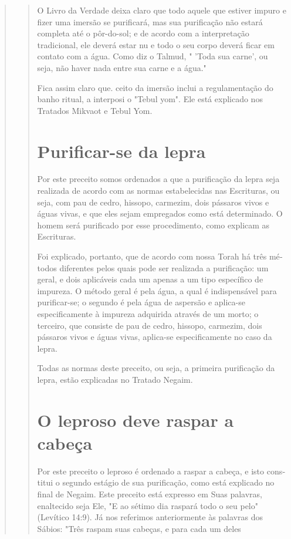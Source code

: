 \begin{quote}
\begin{quote}
O Livro da Verdade deixa claro que todo aquele que estiver impuro e
fizer uma imersão se purificará, mas sua purificação não estará completa
até o pôr-do-sol; e de acordo com a interpretação tradicional, ele
deverá estar nu e todo o seu corpo deverá ficar em contato com a água.
Como diz o Talmud, " 'Toda sua carne', ou seja, não haver nada entre sua
carne e a água."

Fica assim claro que. ceito da imersão inclui a
regulamenta­ção do banho ritual, a interposi o "Tebul yom". Ele está
explicado nos Tratados Mikvaot e Tebul Yom.

\section{Purificar-se da lepra}

Por este preceito somos ordenados a que a purificação da lepra seja
realizada de acordo com as normas estabelecidas nas Escrituras, ou seja,
com pau de cedro, hissopo, carmezim, dois pássaros vivos e águas vivas,
e que eles sejam empregados como está determinado. O homem será
purificado por esse procedimento, como explicam as Escrituras.

Foi explicado, portanto, que de acordo com nossa Torah há três mé­todos
diferentes pelos quais pode ser realizada a purificação: um geral, e
dois aplicáveis cada um apenas a um tipo específico de impureza. O
método geral é pela água, a qual é indispensável para purificar-se; o
segundo é pela água de aspersão e aplica-se especificamente à impureza
adquirida através de um mor­to; o terceiro, que consiste de pau de
cedro, hissopo, carmezim, dois pássaros vivos e águas vivas, aplica-se
especificamente no caso da lepra.

Todas as normas deste preceito, ou seja, a primeira purificação da
lepra, estão explicadas no Tratado Negaim.

\section{O leproso deve raspar a cabeça}

Por este preceito o leproso é ordenado a raspar a cabeça, e isto
cons­titui o segundo estágio de sua purificação, como está explicado no
final de Ne­gaim. Este preceito está expresso em Suas palavras,
enaltecido seja Ele, "E ao sétimo dia raspará todo o seu pelo" (Levítico
14:9). Já nos referimos anterior­mente às palavras dos Sábios: "Três
raspam suas cabeças, e para cada um deles
\end{quote}


\end{quote}
